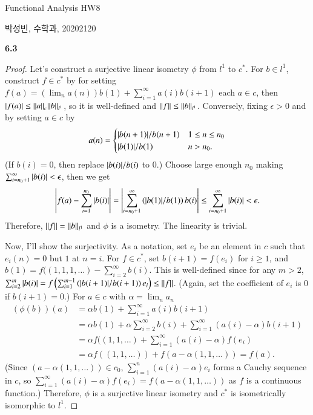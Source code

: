 \documentclass[a4paper, 12pt]{article}
\theoremstyle{Mydefinition}
\theoremstyle{Mytheorem}
\begin{document}
\thispagestyle{myfirstpage}
\begin{center}
	\Large{Functional Analysis HW8}
\end{center}
박성빈, 수학과, 20202120

\noindent \textbf{6.3}

\begin{proof}
Let's construct a surjective linear isometry $\phi$ from $l^1$ to $c^*$. For $b\in l^1$, construct $f\in c^*$ by for setting $f(a) = (\lim_n a(n))b(1) + \sum_{i=1}^\infty a(i)b(i+1)$ each $a\in c$, then $\abs{f(a)}\leq \norm{a}_{c}\norm{b}_{l^1}$, so it is well-defined and $\norm{f}\leq \norm{b}_{l^1}$. Conversely, fixing $\epsilon>0$ and by setting $a\in c$ by 
\begin{equation}
    a(n)=\begin{cases}
    \abs{b(n+1)}/b(n+1) & 1\leq n\leq n_0 \\
    \abs{b(1)}/b(1) & n>n_0.
    \end{cases}
\end{equation}
(If $b(i) = 0$, then replace $\abs{b(i)}/b(i)$ to $0$.) Choose large enough $n_0$ making $\sum_{i=n_0+1}^\infty \abs{b(i)}<\epsilon$, then we get
\begin{equation}
    \abs{f(a) -\sum_{i=1}^{n_0} \abs{b(i)}} =\abs{\sum_{i=n_0+1}^{\infty} \left(\abs{b(1)}/b(1)\right)b(i)}\leq \sum_{i=n_0+1}^\infty \abs{b(i)}<\epsilon.
\end{equation}
Therefore, $\norm{f} = \norm{b}_{l^1}$ and $\phi$ is a isometry. The linearity is trivial.

Now, I'll show the surjectivity. As a notation, set $e_i$ be an element in $c$ such that $e_i(n)=0$ but $1$ at $n=i$. For $f\in c^*$, set $b(i+1)=f(e_i)$ for $i\geq 1$, and $b(1) = f((1,1,1,\ldots) - \sum_{i=2}^\infty b(i)$. This is well-defined since for any $m>2$, $\sum_{i=2}^m \abs{b(i)} = f\left(\sum_{i=1}^{m-1} \left(\abs{b(i+1)}/b(i+1)\right)e_i\right)\leq \norm{f}$. (Again, set the coefficient of $e_i$ is $0$ if $b(i+1) = 0$.) For $a\in c$ with $\alpha = \lim_n a_n$
\begin{equation}
\begin{split}
    (\phi(b))(a) &= \alpha b(1) + \sum_{i=1}^\infty a(i)b(i+1) \\
    &=\alpha b(1)+\alpha\sum_{i=2}^\infty b(i) + \sum_{i=1}^\infty (a(i)-\alpha)b(i+1)\\
    &=\alpha f((1,1,\ldots) + \sum_{i=1}^\infty (a(i)-\alpha)f(e_i) \\
    &=\alpha f((1,1,\ldots)) + f(a-\alpha (1,1,\ldots)) = f(a).
\end{split}
\end{equation}
(Since $(a-\alpha(1,1,\ldots))\in c_0$, $\sum_{i=1}^n (a(i)-\alpha)e_i$ forms a Cauchy sequence in $c$, so $\sum_{i=1}^\infty (a(i)-\alpha)f(e_i) = f(a-\alpha (1,1,\ldots))$ as $f$ is a continuous function.) Therefore, $\phi$ is a surjective linear isometry and $c^*$ is isometrically isomorphic to $l^1$.


\end{proof}
\end{document}
